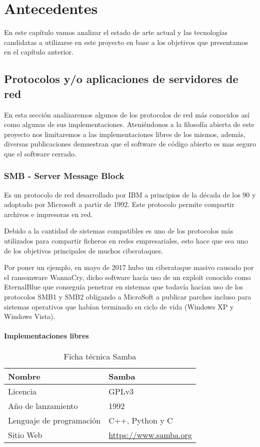 \chapter{Antecedentes}

En este capítulo vamos analizar el estado de arte actual y las tecnologías candidatas a utilizarse en este proyecto en base a los objetivos que presentamos en el capítulo anterior.

\section {Protocolos y/o aplicaciones de servidores de red}

En esta sección analizaremos algunos de los protocolos de red más conocidos así como algunas de sus implementaciones. Ateniéndonos a la filosofía abierta de este proyecto nos limitaremos a las implementaciones libres de los mismos, además, diversas publicaciones demuestran que el software de código abierto es mas seguro que el software cerrado\cite{clark_is_2009}.

\subsection {SMB - Server Message Block}

Es un protocolo de red desarrollado por IBM a principios de la década de los 90 y adoptado por Microsoft a partir de 1992. Este protocolo permite compartir archivos e impresoras en red.

\bigskip
Debido a la cantidad de sistemas compatibles es uno de los protocolos más utilizados para compartir ficheros en redes empresariales, esto hace que sea uno de los objetivos principales de muchos ciberataques.

\bigskip
Por poner un ejemplo, en mayo de 2017 hubo un ciberataque masivo causado por el ransomware WannaCry\cite{sarabia_mayor_2017}, dicho software hacía uso de un exploit conocido como EternalBlue que conseguía penetrar en sistemas que todavía hacían uso de los protocolos SMB1 y SMB2 obligando a MicroSoft a publicar parches incluso para sistemas operativos que habían terminado su ciclo de vida (Windows XP y Windows Vista).


\subsubsection {Implementaciones libres}

\begin{table}[H]
\begin{tabular}{|l|l|}
\hline
Nombre                   & Samba                        \\ \hline
Licencia                 & GPLv3                        \\ \hline
Año de lanzamiento       & 1992                         \\ \hline
Lenguaje de programación & C++, Python y C              \\ \hline
Sitio Web                & \url{https://www.samba.org} 	\\ \hline
\end{tabular}
\caption{Ficha técnica Samba}
\end{table}

